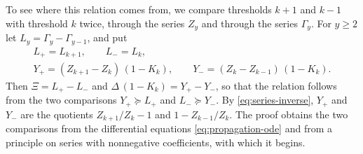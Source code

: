 \documentclass{amsart}
\theoremstyle{definition}
\theoremstyle{remark}
\numberwithin{equation}{section}
\begin{document}
To see where this relation comes from, we compare thresholds
$k+1$ and $k-1$ with threshold $k$ twice, through the series $Z_y$ and
through the series $\Gamma_y$. For $y\ge2$ let $L_y=\Gamma_y-\Gamma_{y-1}$, and put
\begin{gather*}
L_+=L_{k+1},\qquad L_-=L_k,\\
Y_+=(Z_{k+1}-Z_k)\,(1-K_k),\qquad Y_-=(Z_k-Z_{k-1})\,(1-K_k).
\end{gather*}
Then $\Xi=L_+-L_-$ and $\Delta\,(1-K_k)=Y_+-Y_-$, so that
the relation follows from the two comparisons $Y_+\succeq L_+$ and
$L_-\succeq Y_-$.
By \eqref{eq:series-inverse}, $Y_+$ and $Y_-$ are the quotients
$Z_{k+1}/Z_k-1$ and $1-Z_{k-1}/Z_k$. The proof obtains the two comparisons
from the differential equations \eqref{eq:propagation-ode} and from a
principle on series with nonnegative coefficients, with which it begins.
\end{document}
